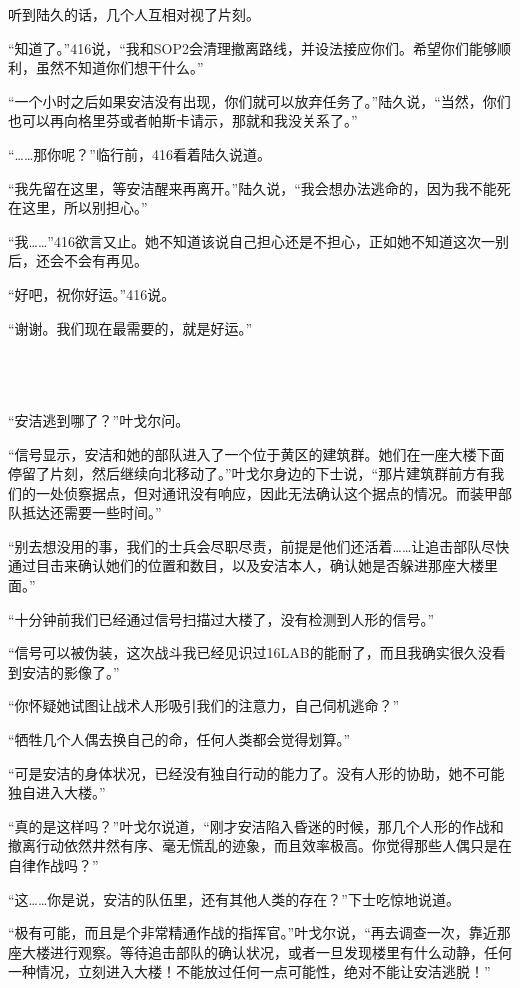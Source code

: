 听到陆久的话，几个人互相对视了片刻。

“知道了。”416说，“我和SOP2会清理撤离路线，并设法接应你们。希望你们能够顺利，虽然不知道你们想干什么。”

“一个小时之后如果安洁没有出现，你们就可以放弃任务了。”陆久说，“当然，你们也可以再向格里芬或者帕斯卡请示，那就和我没关系了。”

“……那你呢？”临行前，416看着陆久说道。

“我先留在这里，等安洁醒来再离开。”陆久说，“我会想办法逃命的，因为我不能死在这里，所以别担心。”

“我……”416欲言又止。她不知道该说自己担心还是不担心，正如她不知道这次一别后，还会不会有再见。

“好吧，祝你好运。”416说。

“谢谢。我们现在最需要的，就是好运。”

 \section*{}

“安洁逃到哪了？”叶戈尔问。

“信号显示，安洁和她的部队进入了一个位于黄区的建筑群。她们在一座大楼下面停留了片刻，然后继续向北移动了。”叶戈尔身边的下士说，“那片建筑群前方有我们的一处侦察据点，但对通讯没有响应，因此无法确认这个据点的情况。而装甲部队抵达还需要一些时间。”

“别去想没用的事，我们的士兵会尽职尽责，前提是他们还活着……让追击部队尽快通过目击来确认她们的位置和数目，以及安洁本人，确认她是否躲进那座大楼里面。”

“十分钟前我们已经通过信号扫描过大楼了，没有检测到人形的信号。”

“信号可以被伪装，这次战斗我已经见识过16LAB的能耐了，而且我确实很久没看到安洁的影像了。”

“你怀疑她试图让战术人形吸引我们的注意力，自己伺机逃命？”

“牺牲几个人偶去换自己的命，任何人类都会觉得划算。”

“可是安洁的身体状况，已经没有独自行动的能力了。没有人形的协助，她不可能独自进入大楼。”

“真的是这样吗？”叶戈尔说道，“刚才安洁陷入昏迷的时候，那几个人形的作战和撤离行动依然井然有序、毫无慌乱的迹象，而且效率极高。你觉得那些人偶只是在自律作战吗？”

“这……你是说，安洁的队伍里，还有其他人类的存在？”下士吃惊地说道。

“极有可能，而且是个非常精通作战的指挥官。”叶戈尔说，“再去调查一次，靠近那座大楼进行观察。等待追击部队的确认状况，或者一旦发现楼里有什么动静，任何一种情况，立刻进入大楼！不能放过任何一点可能性，绝对不能让安洁逃脱！”

